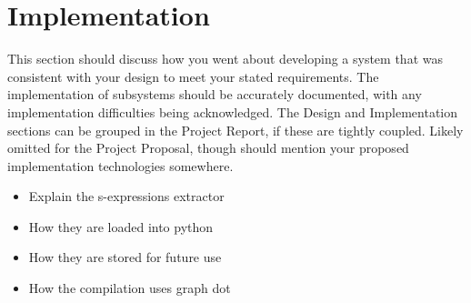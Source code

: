 
\chapter{Implementation} \label{ch:implementation}

This section should discuss how you went about developing a system that was
consistent with your design to meet your stated requirements. The
implementation of subsystems should be accurately documented, with any
implementation difficulties being acknowledged. The Design and Implementation
sections can be grouped in the Project Report, if these are tightly coupled.
Likely omitted for the Project Proposal, though should mention your proposed
implementation technologies somewhere.


\begin{itemize}
\item Explain the s-expressions extractor
\item How they are loaded into python 
\item How they are stored for future use 
\item How the compilation uses graph dot
\end{itemize}
